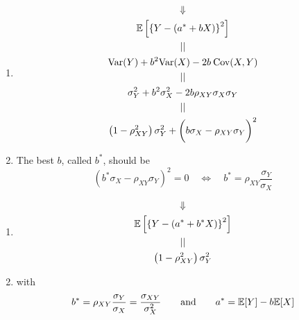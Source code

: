 \begin{frame}[fragile]

\begin{enumerate}
	\item[]
	\begin{gather*}
		\Downarrow\\
\mathbb{E}\left[ \left\{ Y - \left( a^*+b X\right )\right\}^2  \right ]\\
|| \\
		 \text{Var}(Y)
		+b^2 \text{Var}(X)
		-2b\: \text{Cov}(X,Y)\\
		|| \\
		\sigma_Y^2 + b^2 \sigma_X^2 -2b\rho_{XY}\sigma_X\sigma_Y\\
		||\\
		\left(1-\rho_{XY}^2\right)\sigma_Y^2 +
		\bigg(b\sigma_X -\rho_{XY}\sigma_Y \bigg)^2
	\end{gather*}
	\vfill
\item[] The best $b$, called $b^*$, should be
	\vfill
	\[
		\left(b^*\sigma_X -\rho_{XY}\sigma_Y \right)^2 =0
		\quad\Longleftrightarrow\quad
		b^* = \rho_{XY}\frac{\sigma_Y}{\sigma_X}
	\]
\end{enumerate}
\end{frame}
\begin{frame}[fragile]

	\begin{enumerate}
		\item[]
	\begin{gather*}
		\Downarrow\\
\mathbb{E}\left[ \left\{ Y - \left( a^*+b^* X\right )\right\}^2  \right ]\\
|| \\
\left(1-\rho_{XY}^2\right)\sigma_Y^2
	\end{gather*}
	\vfill
\item[] with
	\vfill
			\[
				b^* = \rho_{XY}\frac{\sigma_Y}{\sigma_X}=  \frac{\sigma_{XY}}{\sigma_X^2} \qquad
				\text{and}\qquad
				a^* = \mathbb{E}[Y] -b \mathbb{E}[X]
			\]
			\myEnd
	\end{enumerate}
\end{frame}
